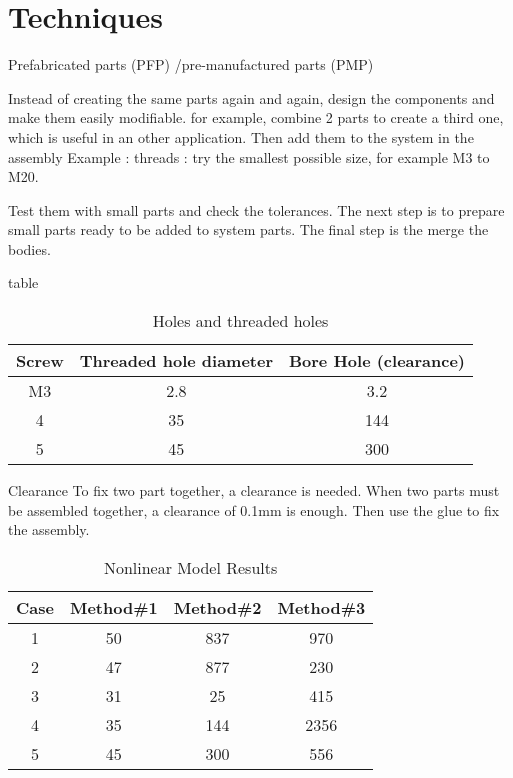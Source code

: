 \documentclass[12pt,a4paper]{article}
\begin{document}
	
	\newpage
	\section{Techniques}
	Prefabricated parts (PFP) /pre-manufactured parts (PMP)
	
	Instead of creating the same parts again and again, design the components and make them easily modifiable.
	for example, combine 2 parts to create a third one, which is useful in an other application. Then add them to the system in the assembly
	Example : threads : try the smallest possible size, for example M3 to M20. 
	
	Test them with small parts and check the tolerances. 
	The next step is to prepare small parts ready to be added to system parts. The final step is the merge the bodies. 
	
	
	table
	
	\begin{table}[ht]
		\caption{Holes and threaded holes} %
		\centering %
		\begin{tabular}{c c c} %
			\hline\hline %
			Screw & Threaded hole diameter & Bore Hole (clearance) \\ [0.5ex] %
			\hline %
			M3 & 2.8 & 3.2 \\ %
			4 & 35 & 144 \\
			5 & 45 & 300 \\ [1ex] %
			\hline %
		\end{tabular}\label{table:nonlin} %
	\end{table}
	
	Clearance
	To fix two part together, a clearance is needed.
	When two parts must be assembled together, a clearance of 0.1mm is enough. Then use the glue to fix the assembly. 
	
	
	
	\begin{table}[ht]
		\caption{Nonlinear Model Results} %
		\centering %
		\begin{tabular}{c c c c} %
			\hline\hline %
			Case & Method\#1 & Method\#2 & Method\#3 \\ [0.5ex] %
			\hline %
			1 & 50 & 837 & 970 \\ %
			2 & 47 & 877 & 230 \\
			3 & 31 & 25 & 415 \\
			4 & 35 & 144 & 2356 \\
			5 & 45 & 300 & 556 \\ [1ex] %
			\hline %
		\end{tabular}\label{table:nonlin} %
	\end{table}
	
\end{document}
